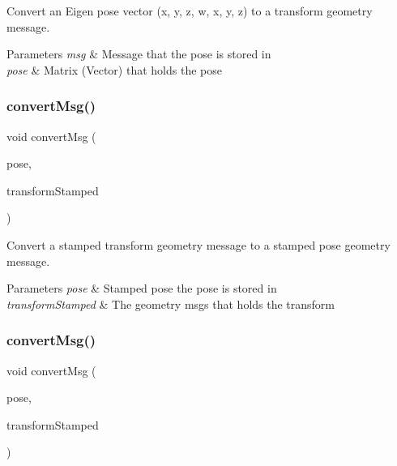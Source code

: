 Convert an Eigen pose vector (x, y, z, w, x, y, z) to a transform geometry message. 


\begin{DoxyParams}{Parameters}
{\em msg} & Message that the pose is stored in \\
\hline
{\em pose} & Matrix (Vector) that holds the pose \\
\hline
\end{DoxyParams}
\mbox{\label{group__multi__robot__controller_gaf99f4d3d714176ee5a3d235ffabb7d3f}} 
\subsubsection{\texorpdfstring{convert\+Msg()}{convertMsg()}\hspace{0.1cm}{\footnotesize\ttfamily [11/14]}}
{\footnotesize\ttfamily void convert\+Msg (\begin{DoxyParamCaption}\item[{geometry\+\_\+msgs\+::\+Pose\+Stamped \&}]{pose,  }\item[{geometry\+\_\+msgs\+::\+Transform\+Stamped \&}]{transform\+Stamped }\end{DoxyParamCaption})\hspace{0.3cm}{\ttfamily [inline]}}



Convert a stamped transform geometry message to a stamped pose geometry message. 


\begin{DoxyParams}{Parameters}
{\em pose} & Stamped pose the pose is stored in \\
\hline
{\em transform\+Stamped} & The geometry msgs that holds the transform \\
\hline
\end{DoxyParams}
\mbox{\label{group__multi__robot__controller_ga21e894dfe1e1216355db06776a630b09}} 
\subsubsection{\texorpdfstring{convert\+Msg()}{convertMsg()}\hspace{0.1cm}{\footnotesize\ttfamily [12/14]}}
{\footnotesize\ttfamily void convert\+Msg (\begin{DoxyParamCaption}\item[{Eigen\+::\+Matrix$<$ double, 7, 1 $>$ \&}]{pose,  }\item[{geometry\+\_\+msgs\+::\+Transform\+Stamped \&}]{transform\+Stamped }\end{DoxyParamCaption})\hspace{0.3cm}{\ttfamily [inline]}}



